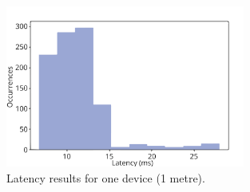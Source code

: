 
\begin{figure}[htbp]
  \centering
    \includegraphics[width=0.7\textwidth]{Chapters/Figures/technical/Latency/figure5.png}
    \caption{Latency results for one device (1 metre).}
    \label{fig:latency_fig5}
\end{figure}

